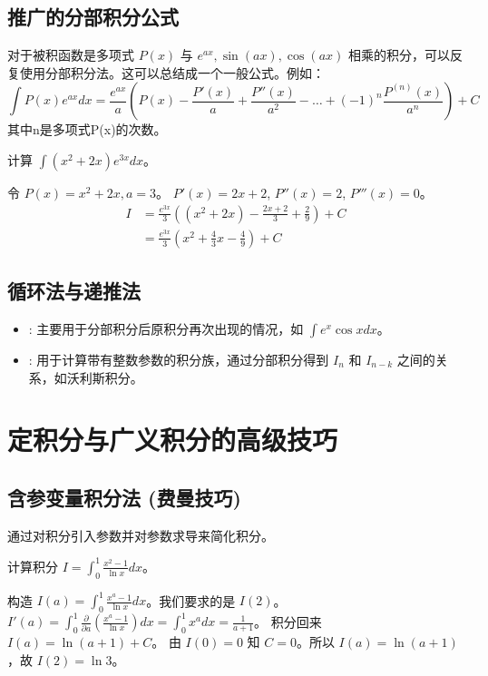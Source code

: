 \documentclass[lang=cn,newtx,10pt,scheme=chinese]{elegantbook}
\renewcommand{\textbf}[1]{\text{\heiti #1}}
\begin{document}
\section{推广的分部积分公式}
对于被积函数是多项式 $P(x)$ 与 $e^{ax}, \sin(ax), \cos(ax)$ 相乘的积分，可以反复使用分部积分法。这可以总结成一个一般公式。例如：
\begin{equation}
\int P(x)e^{ax}dx=\frac{e^{ax}}{a}\left(P(x) - \frac{P'(x)}{a} + \frac{P''(x)}{a^2} - \dots + (-1)^n \frac{P^{(n)}(x)}{a^n}\right) + C
\end{equation}
其中n是多项式P(x)的次数。
\begin{problem}
计算 $\int (x^2+2x)e^{3x} dx$。
\end{problem}
\begin{solution}
令 $P(x)=x^2+2x, a=3$。
$P'(x) = 2x+2$, $P''(x) = 2$, $P'''(x)=0$。
\begin{align*}
    I &= \frac{e^{3x}}{3} \left( (x^2+2x) - \frac{2x+2}{3} + \frac{2}{9} \right) + C \\
      &= \frac{e^{3x}}{3} \left( x^2 + \frac{4}{3}x - \frac{4}{9} \right) + C
\end{align*}
\end{solution}

\section{循环法与递推法}
\begin{itemize}
    \item \textbf{循环法}: 主要用于分部积分后原积分再次出现的情况，如 $\int e^x \cos x dx$。
    \item \textbf{递推法}: 用于计算带有整数参数的积分族，通过分部积分得到 $I_n$ 和 $I_{n-k}$ 之间的关系，如沃利斯积分。
\end{itemize}

\chapter{定积分与广义积分的高级技巧}

\section{含参变量积分法 (费曼技巧)}
通过对积分引入参数并对参数求导来简化积分。
\begin{problem}
    计算积分 $I = \int_0^1 \frac{x^2 - 1}{\ln x} dx$。
\end{problem}
\begin{solution}
    构造 $I(a) = \int_0^1 \frac{x^a - 1}{\ln x} dx$。我们要求的是 $I(2)$。
    $I'(a) = \int_0^1 \frac{\partial}{\partial a} (\frac{x^a - 1}{\ln x}) dx = \int_0^1 x^a dx = \frac{1}{a+1}$。
    积分回来 $I(a) = \ln(a+1) + C$。
    由 $I(0) = 0$ 知 $C=0$。所以 $I(a)=\ln(a+1)$，故 $I(2)=\ln 3$。
\end{solution}
\end{document}
